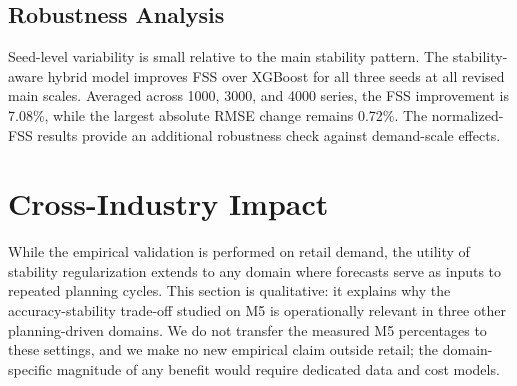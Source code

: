 \documentclass[10pt,conference]{IEEEtran}
\begin{document}
\begin{table}[!t]
\centering
\caption{Runtime scalability under the revised consistent configuration. All main scales use full selected training rows and 300 XGBoost trees.}
\label{tab:runtime_scalability}
\scriptsize
{}
\end{table}


\subsection{Robustness Analysis}
Seed-level variability is small relative to the main stability pattern. The stability-aware hybrid model improves FSS over XGBoost for all three seeds at all revised main scales. Averaged across 1000, 3000, and 4000 series, the FSS improvement is 7.08\%, while the largest absolute RMSE change remains 0.72\%. The normalized-FSS results provide an additional robustness check against demand-scale effects.

\FloatBarrier
\section{Cross-Industry Impact}
While the empirical validation is performed on retail demand, the utility of stability regularization extends to any domain where forecasts serve as inputs to repeated planning cycles. This section is qualitative: it explains why the accuracy-stability trade-off studied on M5 is operationally relevant in three other planning-driven domains. We do not transfer the measured M5 percentages to these settings, and we make no new empirical claim outside retail; the domain-specific magnitude of any benefit would require dedicated data and cost models.
\end{document}
